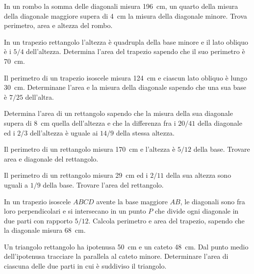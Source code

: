 \begin{multicols}{2}
\begin{esercizio}
\label{ese:7.64}
In un rombo la somma delle diagonali misura 196~cm, un quarto della 
misura della diagonale maggiore supera di 4~cm la misura della 
diagonale minore. Trova perimetro, area e altezza del rombo.
\end{esercizio}

\begin{esercizio}
\label{ese:7.65}
In un trapezio rettangolo l'altezza è quadrupla della base minore e 
il lato obliquo è i \(5/4\) dell'altezza. Determina l'area del trapezio 
sapendo che il suo perimetro è 70~cm.
\end{esercizio}

\begin{esercizio}
\label{ese:7.66}
Il perimetro di un trapezio isoscele misura 124~cm e ciascun lato 
obliquo è lungo 30~cm. Determinane l'area e la misura della diagonale 
sapendo che una sua base è \(7/25\) dell'altra.
\end{esercizio}

\begin{esercizio}
\label{ese:7.67}
Determina l'area di un rettangolo sapendo che la misura della sua 
diagonale supera di 8~cm quella dell'altezza e che la differenza fra 
i \(20/41\) della diagonale ed i \(2/3\) dell'altezza è uguale ai \(14/9\) 
della stessa altezza.
\end{esercizio}

\begin{esercizio}
\label{ese:7.68}
Il perimetro di un rettangolo misura 170~cm e l'altezza è \(5/12\) 
della base. Trovare area e diagonale del rettangolo.
\end{esercizio}

\begin{esercizio}
\label{ese:7.69}
Il perimetro di un rettangolo misura 29~cm ed i \(2/11\) della sua 
altezza sono uguali a \(1/9\) della base. Trovare l'area del rettangolo.
\end{esercizio}

\begin{esercizio}
\label{ese:7.70}
In un trapezio isoscele \(ABCD\) avente la base maggiore \(AB\), le 
diagonali sono fra loro perpendicolari e si intersecano in un punto 
\(P\) che divide ogni diagonale in due parti con rapporto \(5/12\). 
Calcola perimetro e area del trapezio, sapendo che la diagonale 
misura 68~cm.
\end{esercizio}

\begin{esercizio}
\label{ese:7.71}
Un triangolo rettangolo ha ipotenusa 50~cm e un cateto 48~cm. Dal 
punto medio dell'ipotenusa tracciare la parallela al cateto minore. 
Determinare l'area di ciascuna delle due parti in cui è suddiviso il 
triangolo.
\end{esercizio}


\end{multicols}
